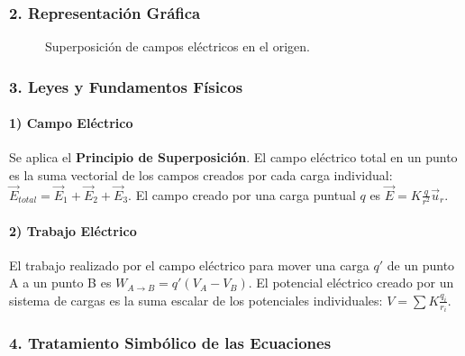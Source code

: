 \subsubsection*{2. Representación Gráfica}
\begin{figure}[H]
    \centering
    \caption{Superposición de campos eléctricos en el origen.}
\end{figure}

\subsubsection*{3. Leyes y Fundamentos Físicos}
\paragraph{1) Campo Eléctrico}
Se aplica el \textbf{Principio de Superposición}. El campo eléctrico total en un punto es la suma vectorial de los campos creados por cada carga individual: $\vec{E}_{total} = \vec{E}_1 + \vec{E}_2 + \vec{E}_3$. El campo creado por una carga puntual $q$ es $\vec{E} = K\frac{q}{r^2}\vec{u}_r$.
\paragraph{2) Trabajo Eléctrico}
El trabajo realizado por el campo eléctrico para mover una carga $q'$ de un punto A a un punto B es $W_{A \to B} = q'(V_A - V_B)$. El potencial eléctrico creado por un sistema de cargas es la suma escalar de los potenciales individuales: $V = \sum K\frac{q_i}{r_i}$.

\subsubsection*{4. Tratamiento Simbólico de las Ecuaciones}
